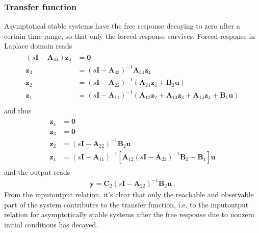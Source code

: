 \documentclass[letterpaper,10pt,english]{jupyterBook}
\begin{document}
\subsubsection{Transfer function}
\label{\detokenize{ch/system-theory/coordinate-transformation:transfer-function}}\label{\detokenize{ch/system-theory/coordinate-transformation:system-theory-coordinate-transformation-examples-kalman-tf}}
\sphinxAtStartPar
Asymptotical stable systems have the free response decaying to zero after a certain time range, so that only the forced response survives. Forced response in Laplace domain reads
\begin{equation*}
\begin{split}\begin{aligned}
  ( s \mathbf{I} - \mathbf{A}_{44}) \mathbf{z}_4 & = \mathbf{0} \\
   \mathbf{z}_3 & = ( s \mathbf{I} - \mathbf{A}_{33})^{-1} \mathbf{A}_{34} \mathbf{z}_4 \\
   \mathbf{z}_2 & = ( s \mathbf{I} - \mathbf{A}_{22})^{-1} \left( \mathbf{A}_{24} \mathbf{z}_4 + \mathbf{B}_2 \mathbf{u} \right) \\
   \mathbf{z}_1 & = ( s \mathbf{I} - \mathbf{A}_{11})^{-1} \left( \mathbf{A}_{12} \mathbf{z}_2 + \mathbf{A}_{13} \mathbf{z}_3 + \mathbf{A}_{14} \mathbf{z}_4 + \mathbf{B}_1 \mathbf{u} \right) \\
\end{aligned}\end{split}
\end{equation*}
\sphinxAtStartPar
and thus
\begin{equation*}
\begin{split}\begin{aligned}
  \mathbf{z}_4 & = \mathbf{0} \\
  \mathbf{z}_3 & = \mathbf{0} \\
  \mathbf{z}_2 & = ( s \mathbf{I} - \mathbf{A}_{22})^{-1} \mathbf{B}_2 \mathbf{u} \\
  \mathbf{z}_1 & = ( s \mathbf{I} - \mathbf{A}_{11})^{-1} \left[ \mathbf{A}_{12} ( s \mathbf{I} - \mathbf{A}_{22})^{-1} \mathbf{B}_2 + \mathbf{B}_1 \right] \mathbf{u}
\end{aligned}\end{split}
\end{equation*}
\sphinxAtStartPar
and the output reads
\begin{equation*}
\begin{split}\mathbf{y} = \mathbf{C}_2 ( s \mathbf{I} - \mathbf{A}_{22})^{-1} \mathbf{B}_2 \mathbf{u} \ .\end{split}
\end{equation*}
\sphinxAtStartPar
From the input\sphinxhyphen{}output relation, it’s clear that only the reachable and observable part of the system contributes to the transfer function, i.e. to the input\sphinxhyphen{}output relation for asymptotically stable systems after the free response due to non\sphinxhyphen{}zero initial conditions has decayed.
\end{document}
